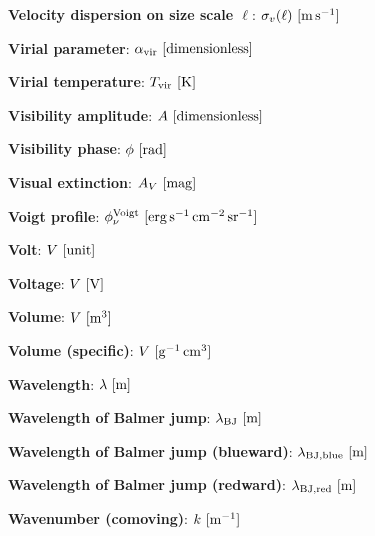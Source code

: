 \documentclass[a4paper,10pt]{article}
\begin{document}
{\noindent}\textbf{Velocity dispersion on size scale $\ell$}: $\sigma_v(\ell) ~ [{\rm m\,s^{-1}}]$

{\noindent}\textbf{Virial parameter}: $\alpha_\mathrm{vir} ~ [{\rm dimensionless}]$

{\noindent}\textbf{Virial temperature}: $T_\mathrm{vir} ~
[{\rm K}]$

{\noindent}\textbf{Visibility amplitude}: $A ~ [{\rm dimensionless}]$

{\noindent}\textbf{Visibility phase}: $\phi ~ [{\rm rad}]$

{\noindent}\textbf{Visual extinction}: $A_V ~ [{\rm mag}]$

{\noindent}\textbf{Voigt profile}: $\phi_\nu^{\rm Voigt}  ~ [{\rm erg\,s^{-1}\,cm^{-2}\,sr^{-1}}]$

{\noindent}\textbf{Volt}: $V ~ [{\rm unit}]$

{\noindent}\textbf{Voltage}: $V ~ [{\rm V}]$

{\noindent}\textbf{Volume}: $V ~ [{\rm m^3}]$

{\noindent}\textbf{Volume (specific)}: $V ~ [{\rm g^{-1}\,cm^3}]$

{\noindent}\textbf{Wavelength}: $\lambda ~ [{\rm m}]$

{\noindent}\textbf{Wavelength of Balmer jump}: $\lambda_{\rm BJ} ~ [{\rm m}]$

{\noindent}\textbf{Wavelength of Balmer jump (blueward)}: $\lambda_{\rm BJ,blue} ~ [{\rm m}]$

{\noindent}\textbf{Wavelength of Balmer jump (redward)}: $\lambda_{\rm BJ,red} ~ [{\rm m}]$

{\noindent}\textbf{Wavenumber (comoving)}: $k ~ [{\rm m^{-1}}]$





































\end{document}

